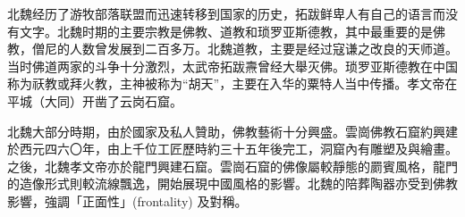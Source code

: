 北魏经历了游牧部落联盟而迅速转移到国家的历史，拓跋鲜卑人有自己的语言而没有文字。北魏时期的主要宗教是佛教、道教和琐罗亚斯德教，其中最重要的是佛教，僧尼的人数曾发展到二百多万。北魏道教，主要是经过寇谦之改良的天师道。当时佛道两家的斗争十分激烈，太武帝拓跋燾曾经大舉灭佛。琐罗亚斯德教在中国称为祆教或拜火教，主神被称为“胡天”，主要在入华的粟特人当中传播。孝文帝在平城（大同）开凿了云岗石窟。

北魏大部分時期，由於國家及私人贊助，佛教藝術十分興盛。雲崗佛教石窟約興建於西元四六〇年，由上千位工匠歷時約三十五年後完工，洞窟內有雕塑及與繪畫。之後，北魏孝文帝亦於龍門興建石窟。雲崗石窟的佛像屬較靜態的罽賓風格，龍門的造像形式則較流線飄逸，開始展現中國風格的影響。北魏的陪葬陶器亦受到佛教影響，強調「正面性」(frontality) 及對稱。

















